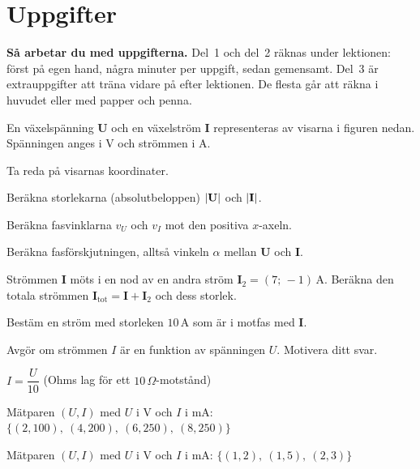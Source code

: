 
\section{Uppgifter}
\label{c8:sec:uppgifter}

\begin{aside}
\textbf{Så arbetar du med uppgifterna.} Del~1 och del~2 räknas under lektionen: först på egen
hand, några minuter per uppgift, sedan gemensamt. Del~3 är extrauppgifter att träna vidare på
efter lektionen. De flesta går att räkna i huvudet eller med papper och penna.

\end{aside}


En växelspänning $\mathbf{U}$ och en växelström $\mathbf{I}$ representeras av visarna i figuren
nedan. Spänningen anges i V och strömmen i A.
\begin{parts}
  \item Ta reda på visarnas koordinater.
  \item Beräkna storlekarna (absolutbeloppen) $\lvert\mathbf{U}\rvert$ och $\lvert\mathbf{I}\rvert$.
  \item Beräkna fasvinklarna $v_U$ och $v_I$ mot den positiva $x$-axeln.
  \item Beräkna fasförskjutningen, alltså vinkeln $\alpha$ mellan $\mathbf{U}$ och $\mathbf{I}$.
  \item Strömmen $\mathbf{I}$ möts i en nod av en andra ström
    $\mathbf{I}_2 = (7;\, -1)\,\text{A}$. Beräkna den totala strömmen
    $\mathbf{I}_{\text{tot}} = \mathbf{I} + \mathbf{I}_2$ och dess storlek.
  \item Bestäm en ström med storleken $10\,\text{A}$ som är i motfas med $\mathbf{I}$.
\end{parts}


Avgör om strömmen $I$ är en funktion av spänningen $U$. Motivera ditt svar.
\begin{parts}
  \item $I = \dfrac{U}{10}$ (Ohms lag för ett $10\,\Omega$-motstånd)
  \item Mätparen $(U, I)$ med $U$ i V och $I$ i mA: $\lbrace(2, 100),\ (4, 200),\ (6, 250),\ (8,
    250)\rbrace$
  \item Mätparen $(U, I)$ med $U$ i V och $I$ i mA: $\lbrace(1, 2),\ (1, 5),\ (2, 3)\rbrace$
\end{parts}


